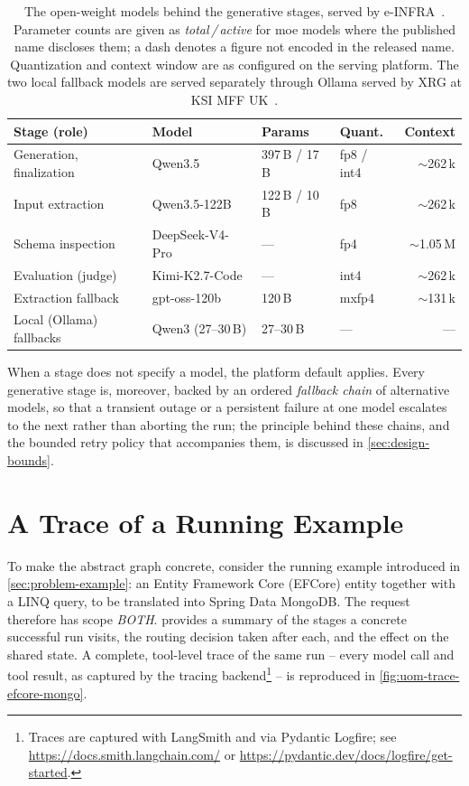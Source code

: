 \begin{table}[t]
\centering
\caption[The model portfolio]{The open-weight models behind the generative stages, served by e-INFRA~\cite{einfraAIaaS}. Parameter counts are given as \emph{total\,/\,active} for \Acrfull{moe} models where the published name discloses them; a dash denotes a figure not encoded in the released name. Quantization and context window are as configured on the serving platform. The two local fallback models are served separately through Ollama served by XRG at KSI MFF UK~\cite{xrg-mff}.}
\label{tab:workflow-models}
\small
\begin{tabularx}{\textwidth}{@{}l l l l r@{}}
\toprule
\textbf{Stage (role)} & \textbf{Model} & \textbf{Params} & \textbf{Quant.} & \textbf{Context} \\
\midrule
Generation, finalization & Qwen3.5~\cite{hfQwen35} & 397\,B / 17\,B & fp8 / int4 & $\sim$262\,k \\
Input extraction & Qwen3.5-122B~\cite{hfQwen35_122B} & 122\,B / 10\,B & fp8 & $\sim$262\,k \\
Schema inspection & DeepSeek-V4-Pro~\cite{hfDeepSeekV4Pro} & --- & fp4 & $\sim$1.05\,M \\
Evaluation (judge) & Kimi-K2.7-Code~\cite{hfKimiK27} & --- & int4 & $\sim$262\,k \\
Extraction fallback & gpt-oss-120b~\cite{hfGptOss120b} & 120\,B & mxfp4 & $\sim$131\,k \\
Local (Ollama) fallbacks & Qwen3 (27--30\,B) & 27--30\,B & --- & --- \\
\bottomrule
\end{tabularx}
\end{table}

When a stage does not specify a model, the platform default applies. Every generative stage is, moreover, backed by an ordered \emph{fallback chain} of alternative models, so that a transient outage or a persistent failure at one model escalates to the next rather than aborting the run; the principle behind these chains, and the bounded retry policy that accompanies them, is discussed in \cref{sec:design-bounds}.

\section{A Trace of a Running Example}
\label{sec:workflow-trace}

To make the abstract graph concrete, consider the running example introduced in \cref{sec:problem-example}: an Entity Framework Core (EFCore) entity together with a LINQ query, to be translated into Spring Data MongoDB. The request therefore has scope \emph{BOTH}.  provides a summary of the stages a concrete successful run visits, the routing decision taken after each, and the effect on the shared state. A complete, tool-level trace of the same run -- every model call and tool result, as captured by the tracing backend\footnote{Traces are captured with LangSmith and via Pydantic Logfire; see \url{https://docs.smith.langchain.com/} or \url{https://pydantic.dev/docs/logfire/get-started}.} -- is reproduced in \cref{fig:uom-trace-efcore-mongo}.

